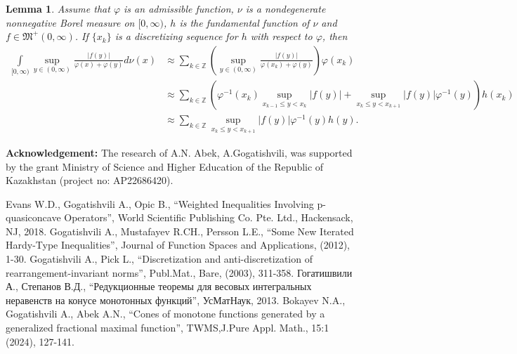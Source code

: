 \documentclass[12pt]{article}
\newtheorem{lemma}{\indent Lemma}
\begin{document}
\begin{lemma}\label{lem3}  \label{discr}
Assume that $\varphi$ is an admissible function, $\nu$ is a nondegenerate nonnegative Borel measure on $[0,\infty)$, $h$ is the fundamental function of $\nu$ and $f\in\mathfrak{M}^+(0,\infty)$. If $\{x_k\}$ is a discretizing sequence for $h$ with respect to $\varphi$, then
\begin{align*}
\int\limits_{[0,\infty)}\sup_{y\in(0,\infty)}\frac{|f(y)|}{\varphi(x)+\varphi(y)}d\nu(x)&
\approx\sum_{k\in\mathbb{Z}} \left(\sup_{y\in(0,\infty)} \frac {|f(y)|}{\varphi(x_k)+\varphi(y)}\right)\varphi(x_k)\\
&\approx\sum_{k\in\mathbb{Z}}\left(\varphi^{-1}(x_k)\sup_{x_{k-1}\leq y<x_k}|f(y)|+\sup_{x_{k}\leq y<x_{k+1}}|f(y)|\varphi^{-1}(y)\right)h(x_k)\\
&\approx\sum_{k\in\mathbb{Z}}\sup_{x_{k}\leq y<x_{k+1}}|f(y)|\varphi^{-1}(y)h(y).
\end{align*}
\end{lemma}

\textbf{Acknowledgement:}
 The research of A.N. Abek, A.Gogatishvili, was supported by the grant Ministry of Science and Higher Education of the Republic of Kazakhstan (project no: AP22686420).

\begin{thebibliography}{00}\label{ref:ref}

 Evans W.D., Gogatishvili A., Opic B., “Weighted Inequalities Involving p-quasiconcave Operators”, World Scientific Publishing Co. Pte. Ltd., Hackensack, NJ, 2018.
 Gogatishvili A., Mustafayev R.CH., Persson L.E., “Some New Iterated Hardy-Type Inequalities”, Journal of Function Spaces and Applications, (2012), 1-30.
 Gogatishvili A., Pick L., “Discretization and anti-discretization of rearrangement-invariant norms”, Publ.Mat., Bare, (2003), 311-358.
 Гогатишвили А., Степанов В.Д., “Редукционные теоремы для весовых интегральных неравенств на конусе монотонных функций”, УсМатНаук, 2013.
 Bokayev N.A., Gogatishvili A., Abek A.N., “Cones of monotone functions generated by a generalized fractional maximal function”, TWMS,J.Pure Appl. Math., 15:1 (2024), 127-141.
\end{thebibliography}
\end{document}
